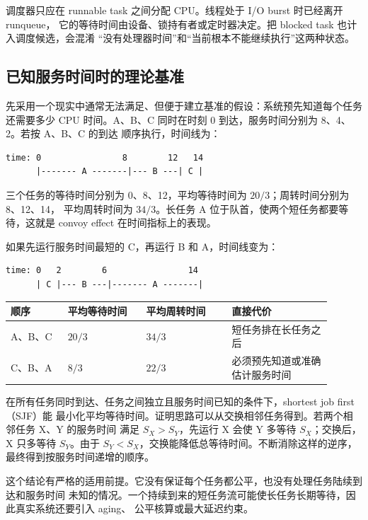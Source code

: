 调度器只应在 runnable task 之间分配 CPU。线程处于 I/O burst 时已经离开 runqueue，
它的等待时间由设备、锁持有者或定时器决定。把 blocked task 也计入调度候选，会混淆
“没有处理器时间”和“当前根本不能继续执行”这两种状态。

\subsection{已知服务时间时的理论基准}

先采用一个现实中通常无法满足、但便于建立基准的假设：系统预先知道每个任务还需要多少
CPU 时间。A、B、C 同时在时刻 0 到达，服务时间分别为 8、4、2。若按 A、B、C 的到达
顺序执行，时间线为：

\begin{lstlisting}
time: 0                8        12   14
      |------- A -------|--- B ---| C |
\end{lstlisting}

三个任务的等待时间分别为 0、8、12，平均等待时间为 $20/3$；周转时间分别为 8、12、14，
平均周转时间为 $34/3$。长任务 A 位于队首，使两个短任务都要等待，这就是 convoy effect
在时间指标上的表现。

如果先运行服务时间最短的 C，再运行 B 和 A，时间线变为：

\begin{lstlisting}
time: 0   2        6                14
      | C |--- B ---|------- A -------|
\end{lstlisting}

\begin{longtable}{|L{0.16\linewidth}|L{0.22\linewidth}|L{0.24\linewidth}|L{0.28\linewidth}|}
\toprule
顺序 & 平均等待时间 & 平均周转时间 & 直接代价 \\
\midrule
A、B、C & $20/3$ & $34/3$ & 短任务排在长任务之后 \\\tablerowrule
C、B、A & $8/3$ & $22/3$ & 必须预先知道或准确估计服务时间 \\
\bottomrule
\end{longtable}

在所有任务同时到达、任务之间独立且服务时间已知的条件下，shortest job first（SJF）能
最小化平均等待时间。证明思路可以从交换相邻任务得到。若两个相邻任务 X、Y 的服务时间
满足 $S_X>S_Y$，先运行 X 会使 Y 多等待 $S_X$；交换后，X 只多等待 $S_Y$。由于
$S_Y<S_X$，交换能降低总等待时间。不断消除这样的逆序，最终得到按服务时间递增的顺序。

这个结论有严格的适用前提。它没有保证每个任务都公平，也没有处理任务陆续到达和服务时间
未知的情况。一个持续到来的短任务流可能使长任务长期等待，因此真实系统还要引入 aging、
公平核算或最大延迟约束。


